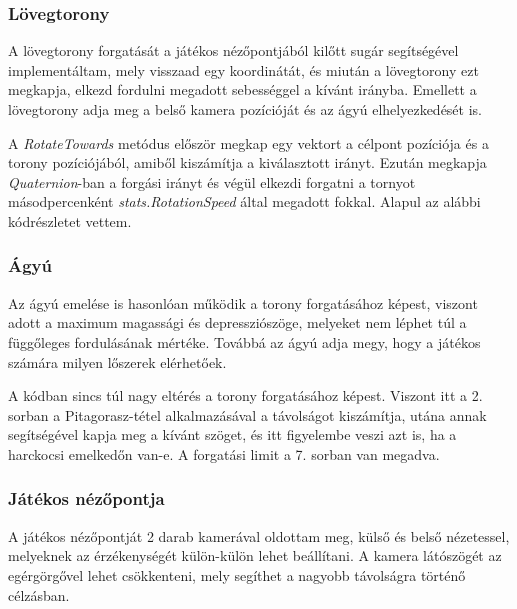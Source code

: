 \documentclass[
]{thesis-ekf}
\theoremstyle{definition}
\theoremstyle{remark}
\begin{document}
\subsubsection{Lövegtorony}

A lövegtorony forgatását a játékos nézőpontjából kilőtt sugár segítségével implementáltam, mely visszaad egy koordinátát, és miután a lövegtorony ezt megkapja, elkezd fordulni megadott sebességgel a kívánt irányba. Emellett a lövegtorony adja meg a belső kamera pozícióját és az ágyú elhelyezkedését is.



A \emph{RotateTowards} metódus először megkap egy vektort a célpont pozíciója és a torony pozíciójából, amiből kiszámítja a kiválasztott irányt. Ezután megkapja \emph{Quaternion}-ban a forgási irányt és végül elkezdi forgatni a tornyot másodpercenként \break
\emph{stats.RotationSpeed} által megadott fokkal. Alapul az alábbi kódrészletet\cite{rotation} vettem.

\subsubsection{Ágyú}

Az ágyú emelése is hasonlóan működik a torony forgatásához képest, viszont adott a maximum magassági és depressziószöge, melyeket nem léphet túl a függőleges fordulásának mértéke. Továbbá az ágyú adja megy, hogy a játékos számára milyen lőszerek elérhetőek.



A kódban sincs túl nagy eltérés a torony forgatásához képest. Viszont itt a 2. sorban a Pitagorasz-tétel\cite{pitagorasz} alkalmazásával a távolságot kiszámítja, utána annak segítségével kapja meg a kívánt szöget, és itt figyelembe veszi azt is, ha a harckocsi emelkedőn van-e. A forgatási limit a 7. sorban van megadva.


\subsubsection{Játékos nézőpontja}

A játékos nézőpontját 2 darab kamerával oldottam meg, külső és belső nézetessel, melyeknek az érzékenységét külön-külön lehet beállítani. A kamera látószögét az egérgörgővel lehet csökkenteni, mely segíthet a nagyobb távolságra történő célzásban.
\end{document}
